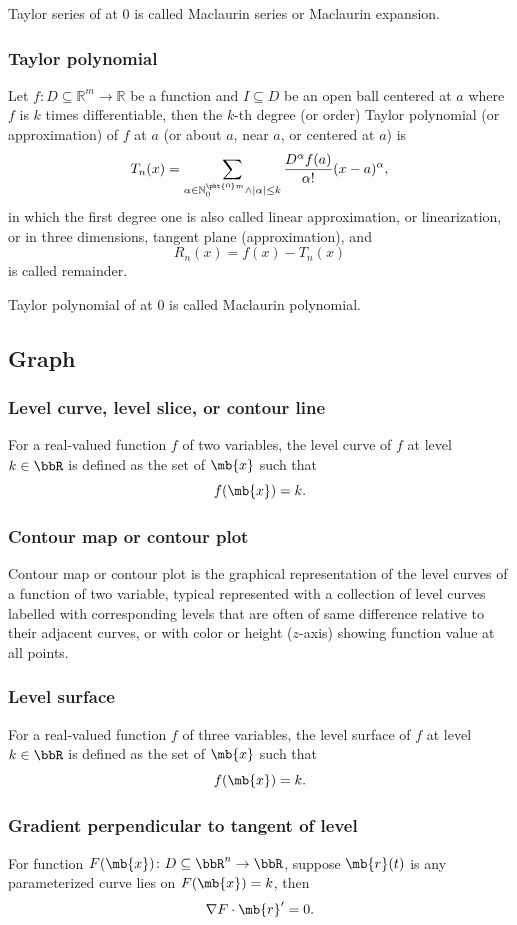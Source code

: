 \documentclass[a4paper,12pt]{report}
\begin{document}
\begin{itemize}
\begin{itemize}
Taylor series of at $0$ is called Maclaurin series or Maclaurin expansion.
\subsubsection{Taylor polynomial}
Let $f\colon D\subseteq\mathbb{R}^m\to\mathbb{R}$ be a function and $I\subseteq D$ be an open ball centered at $a$ where $f$ is $k$ times differentiable, then the $k$-th degree (or order) Taylor polynomial (or approximation) of $f$ at $a$ (or about $a$, near $a$, or centered at $a$) is
\[T_n(x)=\sum_{\alpha\in\mathbb{N}_0^{\pht{0}m}\land|\alpha|\leq k}\frac{D^{\alpha}f(a)}{\alpha !}(x-a)^{\alpha},\]
in which the first degree one is also called linear approximation, or linearization, or in three dimensions, tangent plane (approximation), and
\[R_n(x)=f(x)-T_n(x)\]
is called remainder.

Taylor polynomial of at $0$ is called Maclaurin polynomial.
\subsection{Graph}
\subsubsection{Level curve, level slice, or contour line}
For a real-valued function $f$ of two variables, the level curve of $f$ at level $k\in\bbR$ is defined as the set of $\mb{x}$ such that
\[f(\mb{x})=k.\]
\subsubsection{Contour map or contour plot}
Contour map or contour plot is the graphical representation of the level curves of a function of two variable, typical represented with a collection of level curves labelled with corresponding levels that are often of same difference relative to their adjacent curves, or with color or height ($z$-axis) showing function value at all points.
\subsubsection{Level surface}
For a real-valued function $f$ of three variables, the level surface of $f$ at level $k\in\bbR$ is defined as the set of $\mb{x}$ such that
\[f(\mb{x})=k.\]
\subsubsection{Gradient perpendicular to tangent of level}
For function $F(\mb{x})\colon D\subseteq\bbR^n\to\bbR$, suppose $\mb{r}(t)$ is any parameterized curve lies on $F(\mb{x})=k$, then
\[\nabla F\cdot\mb{r}'=0.\]

\end{itemize}
\end{itemize}
\end{document}
